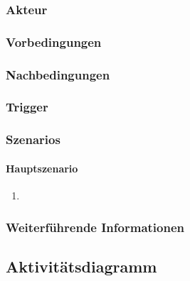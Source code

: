 \subsubsection{Akteur}

\subsubsection{Vorbedingungen}

\subsubsection{Nachbedingungen}

\subsubsection{Trigger}

\subsubsection{Szenarios}

\paragraph{Hauptszenario}
\begin{enumerate}
\item 
\end{enumerate}

\subsubsection{Weiterführende Informationen}

\subsection{Aktivitätsdiagramm}

